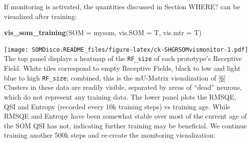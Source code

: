 \documentclass[]{article}
\newenvironment{Shaded}{\begin{snugshade}}{\end{snugshade}}
\newcommand{\CommentTok}[1]{\textcolor[rgb]{0.56,0.35,0.01}{\textit{#1}}}
\newcommand{\DataTypeTok}[1]{\textcolor[rgb]{0.13,0.29,0.53}{#1}}
\newcommand{\DecValTok}[1]{\textcolor[rgb]{0.00,0.00,0.81}{#1}}
\newcommand{\KeywordTok}[1]{\textcolor[rgb]{0.13,0.29,0.53}{\textbf{#1}}}
\newcommand{\NormalTok}[1]{#1}
\newcommand{\OperatorTok}[1]{\textcolor[rgb]{0.81,0.36,0.00}{\textbf{#1}}}
\begin{document}
If monitoring is activated, the quantities discussed in Section WHERE? can be visualized after training:

\begin{Shaded}
\begin{Highlighting}[]
\KeywordTok{vis_som_training}\NormalTok{(}\DataTypeTok{SOM =}\NormalTok{ mysom, }\DataTypeTok{vis.SOM =}\NormalTok{ T, }\DataTypeTok{vis.mtr =}\NormalTok{ T)}
\end{Highlighting}
\end{Shaded}

\texttt{[image: SOMDisco.README\_files/figure-latex/ck-SHGRSOMvismonitor-1.pdf]}
The top panel displays a heatmap of the \texttt{RF\_size} of each prototype's Receptive Field. White tiles correspond to empty Receptive Fields, black to low and light blue to high \texttt{RF\_size}; combined, this is the mU-Matrix visualization of {[}\protect\hyperlink{ref-MerenyiJainVillmann}{6}{]} Clusters in these data are readily visible, separated by areas of ``dead'' neurons, which do not represent any training data. The lower panel plots the RMSQE, QSI and Entropy (recorded every 10k training steps) vs training age. While RMSQE and Entropy have been somewhat stable over most of the current age of the SOM QSI has not, indicating further training may be beneficial. We continue training another 500k steps and re-create the monitoring visualization:

\begin{Shaded}
\end{Shaded}
\end{document}
